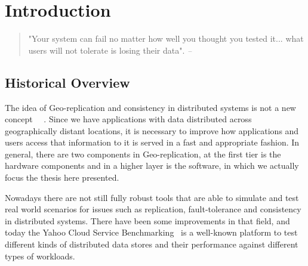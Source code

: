 
%
%
%


\chapter{Introduction}
\label{ch:intro}

\begin{quotation}
"Your system can fail no matter how well you thought you tested it... what users will not tolerate is losing their data".
{\small\it -- ~\cite{Cosmin2010} }
\end{quotation}




\section{Historical Overview}
The idea of Geo-replication and consistency in distributed systems is not a new concept~\cite{Ferreira:98} ~\cite{Kubiatowicz:2000}. Since we have applications with data distributed across geographically distant locations, it is necessary to improve how applications and users access that information to it is served in a fast and appropriate fashion. In general, there are two components in Geo-replication, at the first tier is the hardware components and in a higher layer is the software, in which we actually focus the thesis here presented.

Nowadays there are not still fully robust tools that are able to simulate and test real world scenarios for issues such as replication, fault-tolerance and consistency in distributed systems. There have been some improvements in that field, and today the Yahoo Cloud Service Benchmarking~\cite{YCSB:2010} is a well-known platform to test different kinds of distributed data stores and their performance against different types of workloads. 

